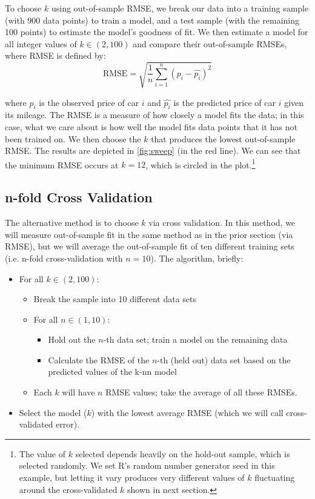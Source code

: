 \documentclass[11pt, fleqn]{article}
\begin{document}
To choose $k$ using out-of-sample RMSE, we break our data into a training sample (with 900 data points) to train a model, and a test sample (with the remaining 100 points) to estimate the model's goodness of fit. We then estimate a model for all integer values of $k \in (2,100)$ and compare their out-of-sample RMSEs, where RMSE is defined by:
\[ \text{RMSE} = \sqrt{\frac{1}{n} \sum_{i=1}^{n} \left( p_i - \hat{p_i} \right)^2} \]

where $p_i$ is the observed price of car $i$ and $\hat{p_i}$ is the predicted price of car $i$ given its mileage. The RMSE is a measure of how closely a model fits the data; in this case, what we care about is how well the model fits data points that it has not been trained on. We then choose the $k$ that produces the lowest out-of-sample RMSE. The results are depicted in \cref{fig:sweep} (in the red line). We can see that the minimum RMSE occurs at $k=12$, which is circled in the plot.\footnote{The value of \(k\) selected depends heavily on the hold-out sample, which is selected randomly. We set R's random number generator seed in this example, but letting it vary produces very different values of \(k\) fluctuating around the cross-validated \(k\) shown in next section.}

\subsection{n-fold Cross Validation}\label{sec:cv}

The alternative method is to choose \(k\) via cross validation. In this method, we will measure out-of-sample fit in the same method as in the prior section (via RMSE), but we will average the out-of-sample fit of ten different training sets (i.e. n-fold cross-validation with \(n=10\)). The algorithm, briefly:
\begin{itemize}
\item For all \(k \in (2,100)\):
\begin{itemize}
\item Break the sample into 10 different data sets
\item For all \(n \in (1, 10)\):
\begin{itemize}
\item Hold out the \(n\)-th data set; train a model on the remaining data
\item Calculate the RMSE of the \(n\)-th (held out) data set based on the predicted values of the k-nn model
\end{itemize}
\item Each \(k\) will have \(n\) RMSE values; take the average of all these RMSEs.
\end{itemize}
\item Select the model (\(k\)) with the lowest average RMSE (which we will call cross-validated error).
\end{itemize}
\end{document}

